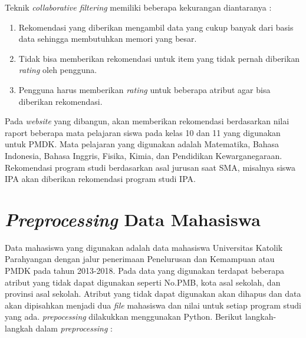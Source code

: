 Teknik \textit{collaborative filtering} memiliki beberapa kekurangan diantaranya : 

\begin{enumerate}
    \item Rekomendasi yang diberikan mengambil data yang cukup banyak dari basis data sehingga membutuhkan memori yang besar.
    
    \item Tidak bisa memberikan rekomendasi untuk item yang tidak pernah diberikan \textit{rating} oleh pengguna.
    
    \item Pengguna harus memberikan \textit{rating} untuk beberapa atribut agar bisa diberikan rekomendasi.
    
\end{enumerate}

Pada \textit{website} yang dibangun, akan memberikan rekomendasi berdasarkan nilai raport beberapa mata pelajaran siswa pada kelas 10 dan 11 yang digunakan untuk PMDK. Mata pelajaran yang digunakan adalah Matematika, Bahasa Indonesia, Bahasa Inggris, Fisika, Kimia, dan Pendidikan Kewarganegaraan. Rekomendasi program studi berdasarkan asal jurusan saat SMA, misalnya siswa IPA akan diberikan rekomendasi program studi IPA.

\section{\textit{Preprocessing} Data Mahasiswa}
\label{sec:preprocessing}
Data mahasiswa yang digunakan adalah data mahasiswa Universitas Katolik Parahyangan dengan jalur penerimaan Penelurusan dan Kemampuan atau PMDK pada tahun 2013-2018. Pada data yang digunakan terdapat beberapa atribut yang tidak dapat digunakan seperti No.PMB,  kota asal sekolah, dan provinsi asal sekolah. Atribut yang tidak dapat digunakan akan dihapus dan data akan dipisahkan menjadi dua \textit{file} mahasiswa dan nilai untuk setiap program studi yang ada. \textit{prepocessing} dilakukkan menggunakan Python. Berikut langkah-langkah dalam \textit{preprocessing} :


